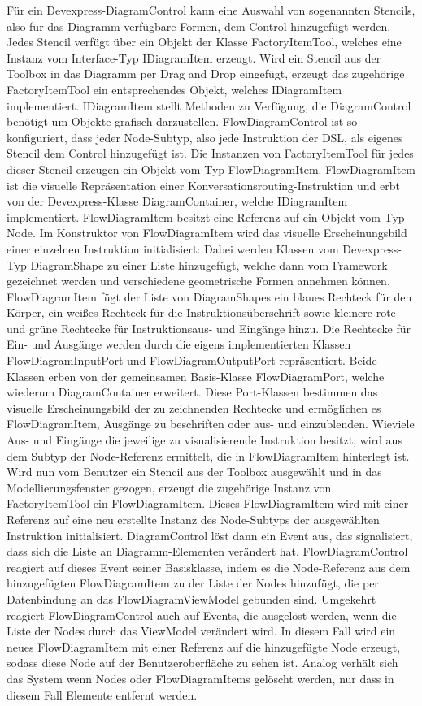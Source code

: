 Für ein Devexpress-DiagramControl kann eine Auswahl von sogenannten Stencils, also für das Diagramm verfügbare Formen, dem Control hinzugefügt werden. Jedes Stencil verfügt über ein Objekt der Klasse FactoryItemTool, welches eine Instanz vom Interface-Typ IDiagramItem erzeugt. Wird ein Stencil aus der Toolbox in das Diagramm per Drag and Drop eingefügt, erzeugt das zugehörige FactoryItemTool ein entsprechendes Objekt, welches IDiagramItem implementiert. IDiagramItem stellt Methoden zu Verfügung, die DiagramControl benötigt um Objekte grafisch darzustellen. FlowDiagramControl ist so konfiguriert, dass jeder Node-Subtyp, also jede Instruktion der DSL, als eigenes Stencil dem Control hinzugefügt ist. Die Instanzen von FactoryItemTool für jedes dieser Stencil erzeugen ein Objekt vom Typ FlowDiagramItem. FlowDiagramItem ist die visuelle Repräsentation einer Konversationsrouting-Instruktion und erbt von der Devexpress-Klasse DiagramContainer, welche IDiagramItem implementiert. FlowDiagramItem besitzt eine Referenz auf ein Objekt vom Typ Node. Im Konstruktor von FlowDiagramItem wird das visuelle Erscheinungsbild einer einzelnen Instruktion initialisiert: Dabei werden Klassen vom Devexpress-Typ DiagramShape zu einer Liste hinzugefügt, welche dann vom Framework gezeichnet werden und verschiedene geometrische Formen annehmen können. FlowDiagramItem fügt der Liste von DiagramShapes ein blaues Rechteck für den Körper, ein weißes Rechteck für die Instruktionsüberschrift sowie kleinere rote und grüne Rechtecke für Instruktionsaus- und Eingänge hinzu. Die Rechtecke für Ein- und Ausgänge werden durch die eigens implementierten Klassen FlowDiagramInputPort und FlowDiagramOutputPort repräsentiert. Beide Klassen erben von der gemeinsamen Basis-Klasse FlowDiagramPort, welche wiederum DiagramContainer erweitert. Diese Port-Klassen bestimmen das visuelle Erscheinungsbild der zu zeichnenden Rechtecke und ermöglichen es FlowDiagramItem, Ausgänge zu beschriften oder aus- und einzublenden. Wieviele Aus- und Eingänge die jeweilige zu visualisierende Instruktion besitzt, wird aus dem Subtyp der Node-Referenz ermittelt, die in FlowDiagramItem hinterlegt ist.
\newline
Wird nun vom Benutzer ein Stencil aus der Toolbox ausgewählt und in das Modellierungsfenster gezogen, erzeugt die zugehörige Instanz von FactoryItemTool ein FlowDiagramItem. Dieses FlowDiagramItem wird mit einer Referenz auf eine neu erstellte Instanz des Node-Subtyps der ausgewählten Instruktion initialisiert. DiagramControl löst dann ein Event aus, das signalisiert, dass sich die Liste an Diagramm-Elementen verändert hat. FlowDiagramControl reagiert auf dieses Event seiner Basisklasse, indem es die Node-Referenz aus dem hinzugefügten FlowDiagramItem zu der Liste der Nodes hinzufügt, die per Datenbindung an das FlowDiagramViewModel gebunden sind. Umgekehrt reagiert FlowDiagramControl auch auf Events, die ausgelöst werden, wenn die Liste der Nodes durch das ViewModel verändert wird. In diesem Fall wird ein neues FlowDiagramItem mit einer Referenz auf die hinzugefügte Node erzeugt, sodass diese Node auf der Benutzeroberfläche zu sehen ist. Analog verhält sich das System wenn Nodes oder FlowDiagramItems gelöscht werden, nur dass in diesem Fall Elemente entfernt werden.
